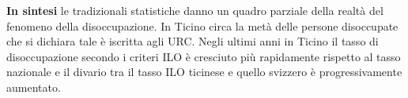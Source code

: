 \textbf{In sintesi} le tradizionali statistiche danno un quadro parziale della realtà del fenomeno della disoccupazione. In Ticino circa la metà delle persone disoccupate che si dichiara tale è iscritta agli URC. Negli ultimi anni in Ticino il tasso di disoccupazione secondo i criteri ILO è cresciuto più rapidamente rispetto al tasso nazionale e il divario tra il tasso ILO ticinese e quello svizzero è progressivamente aumentato.